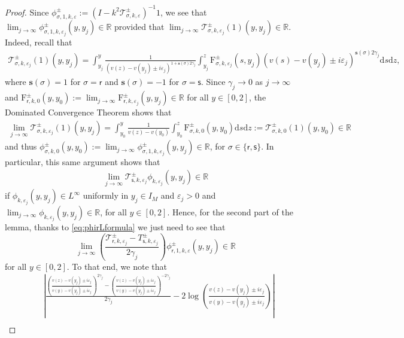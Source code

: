 \documentclass[11pt,reqno]{amsproc}
\theoremstyle{definition}
\numberwithin{equation}{section}
\newcommand{\R}{{\mathbb R}}
\newcommand{\sr}{{\mathsf{r}}}
\newcommand{\s}{{\mathsf{s}}}
\newcommand{\cT}{{\mathcal T}}
\renewcommand{\d}{\mathrm{d}}
\newcommand{\ep}{\varepsilon}
\begin{document}
\begin{proof}
Since $\phi_{\sigma,1,k,\ep}^\pm := (I- k^2 \cT_{\sigma,k,\ep}^\pm)^{-1} 1$, we see that $\lim_{j\rightarrow\infty}\phi_{\sigma,1,k,\ep_j}^\pm(y,y_j)\in \R$ provided that $\lim_{j\rightarrow\infty}\cT_{\sigma,k,\ep_j}^\pm (1)(y,y_j)\in \R$. Indeed, recall that
\begin{align*}
\cT_{\sigma,k,\ep_j}^\pm(1)(y,y_j) = \int_{y_j}^y\frac{1}{(v(z) - v(y_j) \pm i \ep_j)^{1 + \mathbf{s}(\sigma)2\gamma_j}}\int_{y_j}^z \mathrm{F}_{\sigma,k,\ep_j}^\pm(s,y_j) (v(s) - v(y_j) \pm i\ep_j)^{\mathbf{s}(\sigma)2\gamma_j} \d s \d z,
\end{align*}
where $\mathbf{s}(\sigma)=1$ for $\sigma = \sr$ and $\mathbf{s}(\sigma) = -1$ for $\sigma = \s$. Since $\gamma_j\rightarrow 0$ as $j\rightarrow \infty$ and $\mathrm{F}_{\sr,k,0}^\pm(y,y_0):=\lim_{j\rightarrow \infty} \mathrm{F}_{\sr,k,\ep_j}^\pm(y,y_j)\in \R$ for all $y\in[0,2]$, the Dominated Convergence Theorem shows that
\begin{align*}
\lim_{j\rightarrow \infty} \cT_{\sigma,k,\ep_j}^\pm(1)(y,y_j) =\int_{y_0}^y \frac{1}{v(z) - v(y_0)}\int_{y_0}^z \mathrm{F}_{\sigma,k,0}^\pm(y,y_0) \d s \d z := \cT_{\sigma,k,0}^\pm(1)(y,y_0)\in \R
\end{align*}
and thus $\phi_{\sigma,k,0}^\pm(y,y_0):=\lim_{j\rightarrow\infty}\phi_{\sigma,1,k,\ep_j}^\pm(y,y_j)\in \R$, for $\sigma\in \lbrace \sr, \s \rbrace$. In particular, this same argument shows that 
\begin{align*}
\lim_{j\rightarrow \infty}\cT_{\s,k,\ep_j}^\pm \phi_{k,\ep_j}(y,y_j) \in \R
\end{align*}
if $ \phi_{k,\ep_j}(y,y_j)\in L^\infty$ uniformly in $y_j\in I_M$ and $\ep_j>0$ and $\lim_{j\rightarrow\infty}  \phi_{k,\ep_j}(y,y_j) \in \R$, for all $y\in[0,2]$. Hence, for the second part of the lemma, thanks to \eqref{eq:phirLformula} we just need to see that 
\begin{equation}\label{eq:limTrLphir}
\lim_{j\rightarrow \infty} \left(\frac{\cT_{\sr,k,\ep_j}^\pm-T_{\s,k,\ep_j}^\pm}{2\gamma_j} \right)\phi_{\sr,1,k,\ep}^\pm(y,y_j)\in \R
\end{equation}
for all $y\in [0,2]$. To that end, we note that
\begin{align*}
&\left| \frac{\left( \frac{v(z) - v(y_j) \pm i\ep_j}{v(y) - v(y_j) \pm i\ep_j} \right)^{2\gamma_j} -\left( \frac{v(z) - v(y_j) \pm i\ep_j}{v(y) - v(y_j) \pm i\ep_j} \right)^{-2\gamma_j}}{2\gamma_j} - 2\log \left( \frac{v(z) - v(y_j) \pm i\ep_j}{v(y) - v(y_j) \pm i\ep_j} \right) \right| \\

\end{align*}
\end{proof}
\end{document}
